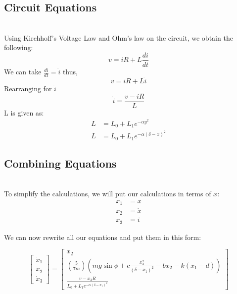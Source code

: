 \subsection*{Circuit Equations}\hfill \\
Using Kirchhoff's Voltage Law and Ohm's law on the circuit, we obtain the following:
\begin{equation}
v = iR + L\frac{di}{dt}   
\end{equation}
We can take $\frac{di}{dt} = \Dot{i} $ thus,
\\
\begin{equation}
      v = iR +L\Dot{i}  
\end{equation}
Rearranging for $\dot{i} $
\begin{equation}
    \dot{i} = \frac{v - iR}{L}  
\end{equation}
L is given as:
\begin{align*}
    L &= L_0 + L_1e^{-\alpha y^2}\\
    L &= L_0 + L_1e^{-\alpha (\delta - x)^2}
\end{align*}
\subsection*{Combining Equations}\hfill \\
To simplify the calculations, we will put our calculations in terms of $x $:
\begin{align*}
    x_1 &= x
    \\
    x_2 &= \Dot{x} 
    \\
    x_3 &= i
\end{align*}

We can now rewrite all our equations and put them in this form:

\begin{equation}
\begin{bmatrix}
\Dot{x}_1 \\
\Dot{x}_2 \\
\Dot{x}_3
\end{bmatrix} 
=
\begin{bmatrix}
 x_2\\
(\frac{5}{7m})  \left(mg\sin{\phi} + c\frac{x_3^2}{(\delta - x_1)^2} - bx_2 -k(x_1-d)  \right)\\
\frac{v - x_3R}{L_0 + L_1e^{-\alpha (\delta - x_1)^2}}  
\end{bmatrix} 
\end{equation}